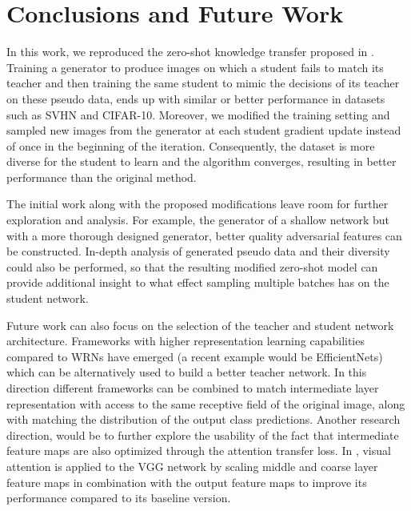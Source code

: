 \section{Conclusions and Future Work}
In this work, we reproduced the zero-shot knowledge transfer proposed in \cite{Micaelli2019ZeroShotKT}. Training a generator to produce images on which a student fails to match its teacher and then training the same student to mimic the decisions of its teacher on these pseudo data, ends up with similar or better performance in datasets such as SVHN and CIFAR-10. Moreover, we modified the training setting and sampled new images from the generator at each student gradient update instead of once in the beginning of the iteration. Consequently, the dataset is more diverse for the student to learn and the algorithm converges, resulting in better performance than the original method.

The initial work along with the proposed modifications leave room for further exploration and analysis. For example, the generator of a shallow network but with a more thorough designed generator, better quality adversarial features can be constructed. In-depth analysis of generated pseudo data and their diversity could also be performed, so that the resulting modified zero-shot model can provide additional insight to what effect sampling multiple batches has on the student network.

Future work can also focus on the selection of the teacher and student network architecture. Frameworks with higher representation learning capabilities compared to WRNs have emerged (a recent example would be EfficientNets\cite{effnet}) which can be alternatively used to build a better teacher network. In this direction different frameworks can be combined to match intermediate layer representation with access to the same receptive field of the original image, along with matching the distribution of the output class predictions. Another research direction, would be to further explore the usability of the fact that intermediate feature maps are also optimized through the attention transfer loss. In \cite{ltpa}, visual attention is applied to the VGG network\cite{vgg} by scaling middle and coarse layer feature maps in combination with the output feature maps to improve its performance compared to its baseline version. 
